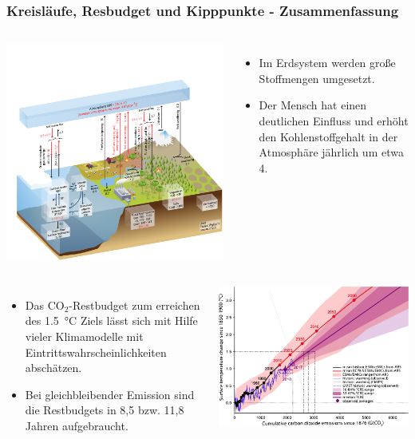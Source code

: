 \begin{frame}
	\frametitle{Kreisläufe, Resbudget und Kipppunkte - Zusammenfassung}
	\begin{columns}
			\includegraphics[trim={1cm 0cm 0cm 3cm}, clip, width=0.8\linewidth]{bilder/kohlenstoff/carbon_cycle_industrial-ocean.pdf}
			\begin{itemize}
				\item Im Erdsystem werden große Stoffmengen umgesetzt.
				\item Der Mensch hat einen deutlichen Einfluss und erhöht den Kohlenstoffgehalt in der Atmosphäre jährlich um etwa \SI{4}{\GtCO}.
			\end{itemize}
	\end{columns}
	\begin{columns}
		\column{0.7\linewidth}
			\begin{itemize}
				\item Das CO$_2$-Restbudget zum erreichen des \SI{1.5}{\degreeCelsius} Ziels lässt sich mit Hilfe vieler Klimamodelle mit Eintrittswahrscheinlichkeiten abschätzen.
				\item Bei gleichbleibender Emission sind die Restbudgets in 8,5 bzw. 11,8 Jahren aufgebraucht.
			\end{itemize}
		\column{0.3\linewidth}
			\includegraphics[width=0.9\linewidth]{bilder/cumulative_co2/cumulative_co2-4.pdf}

\end{columns}
\end{frame}
